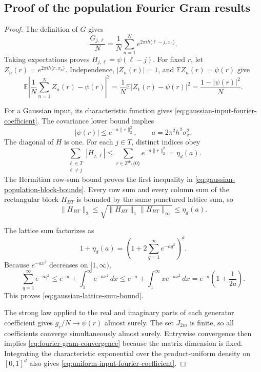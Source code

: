 \subsection{Proof of the population Fourier Gram results}

\begin{proof}
The definition of \(G\) gives
\[
    \frac{G_{j,\ell}}{N}
    =\frac1N\sum_{n=1}^N
    e^{2\pi i h\langle\ell-j,x_n\rangle}.
\]
Taking expectations proves \(H_{j,\ell}=\psi(\ell-j)\). For fixed \(r\),
let \(Z_n(r)=e^{2\pi i h\langle r,x_n\rangle}\). Independence,
\(|Z_n(r)|=1\), and \(\mathbb EZ_n(r)=\psi(r)\) give
\[
    \mathbb E\left|
        \frac1N\sum_{n=1}^NZ_n(r)-\psi(r)
    \right|^2
    =\frac1N\mathbb E|Z_1(r)-\psi(r)|^2
    =\frac{1-|\psi(r)|^2}{N}.
\]

For a Gaussian input, its characteristic function gives
\cref{eq:gaussian-input-fourier-coefficient}. The covariance lower bound
implies
\[
    |\psi(r)|
    \leq e^{-a\|r\|_2^2},
    \qquad a=2\pi^2h^2\sigma_x^2.
\]
The diagonal of \(H\) is one. For each \(j\in T\), distinct indices obey
\[
    \sum_{\substack{\ell\in T\\\ell\ne j}}|H_{j,\ell}|
    \leq\sum_{r\in\mathbb Z^d\setminus\{0\}}e^{-a\|r\|_2^2}
    =\eta_d(a).
\]
The Hermitian row-sum bound proves the first inequality in
\cref{eq:gaussian-population-block-bounds}. Every row sum and every column
sum of the rectangular block \(H_{BT}\) is bounded by the same punctured
lattice sum, so
\[
    \|H_{BT}\|_2
    \leq\sqrt{\|H_{BT}\|_1\|H_{BT}\|_\infty}
    \leq\eta_d(a).
\]

The lattice sum factorizes as
\[
    1+\eta_d(a)
    =\left(1+2\sum_{q=1}^\infty e^{-aq^2}\right)^d.
\]
Because \(e^{-ax^2}\) decreases on \([1,\infty)\),
\[
    \sum_{q=1}^\infty e^{-aq^2}
    \leq e^{-a}+\int_1^\infty e^{-ax^2}\,dx
    \leq e^{-a}+\int_1^\infty xe^{-ax^2}\,dx
    =e^{-a}\left(1+\frac1{2a}\right).
\]
This proves \cref{eq:gaussian-lattice-sum-bound}.

The strong law applied to the real and imaginary parts of each generator
coefficient gives \(g_r/N\to\psi(r)\) almost surely. The set \(J_{2m}\) is
finite, so all coefficients converge simultaneously almost surely. Entrywise
convergence then implies \cref{eq:fourier-gram-convergence} because the matrix
dimension is fixed. Integrating the characteristic exponential over the
product-uniform density on \([0,1]^d\) also gives
\cref{eq:uniform-input-fourier-coefficient}.
\end{proof}

